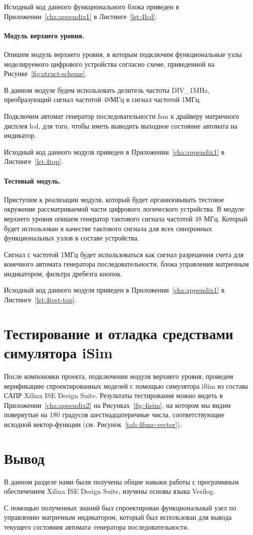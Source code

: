 Исходный код данного функционального блока приведен в Приложении~\ref{cha:appendix1} в Листинге~\ref{lst:4lcd}.


\paragraph{Модуль верхнего уровня.}
Опишем модуль верхнего уровня, в которым подключим функциональные узлы моделируемого цифрового устройства согласно схеме, приведенной на Рисунке~\ref{fig:struct-scheme}.

В данном модуле будем использовать делитель частоты DIV\_1MHz, преобразующий сигнал частотой 48МГц в сигнал частотой 1МГц.

Подключим автомат генератор последовательности fsm к драйверу матричного дисплея lcd, для того, чтобы иметь выводить выходное состояние автомата на индикатор.

Исходный код данного модуля приведен в Приложении~\ref{cha:appendix1} в Листинге~\ref{lst:4top}.

\paragraph{Тестовый модуль.}
Приступим к реализации модуля, который будет организовывать тестовое окружение рассматриваемой части цифрового логического устройства. В модуле верхнего уровня опишем генератор тактового сигнала частотой 48 МГц. Который будет использован в качестве тактового сигнала для всех синхронных функциональных узлов в составе устройства. 

Сигнал с частотой 1МГц будет использоваться как сигнал разрешения счета для конечного автомата генератора последовательности, блока управления матричным индикатором, фильтра дребезга кнопок. 

Исходный код данного модуля приведен в Приложении~\ref{cha:appendix1} в Листинге~\ref{lst:4test-top}.


\section{Тестирование и отладка средствами симулятора iSim}
После компоновки проекта, подключения модуля верхнего уровня, проведем верификацию спроектированных моделей с помощью симулятора iSim из состава САПР Xilinx ISE Design Suite. Результаты тестирования можно видеть в Приложении~\ref{cha:appendix2} на Рисунках~\ref{fig:4isim}, на котором мы видим повернутые на 180 градусов шестнадцатеричные числа, соответствующие исходной вектор-функции (см. Рисунок~\ref{tab:4func-vector}).


\section{Вывод}

В данном разделе нами были получены общие навыки работы с программным обеспечением Xilinx ISE Design Suite, изучены основы языка Verilog.

С помощью полученных знаний был спроектирован функциональный узел по управлению матричным индикатором, который был использован для вывода текущего состояния автомата--генератора последовательности.


